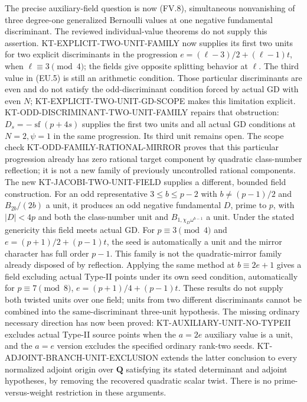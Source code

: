The precise auxiliary-field question is now (FV.8), simultaneous
nonvanishing of three degree-one generalized Bernoulli values
at one negative fundamental discriminant. The reviewed
individual-value theorems do not supply this assertion.
KT-EXPLICIT-TWO-UNIT-FAMILY now supplies its first two
units for two explicit discriminants in the progression
$e=(\ell-3)/2+(\ell-1)t$, when $\ell\equiv3\pmod4$;
the fields give opposite splitting behavior at $\ell$.
The third value in (EU.5) is still an arithmetic condition.
Those particular discriminants are even and do not satisfy
the odd-discriminant condition forced by actual GD with even
$N$; KT-EXPLICIT-TWO-UNIT-GD-SCOPE makes this limitation explicit.
KT-ODD-DISCRIMINANT-TWO-UNIT-FAMILY repairs that obstruction:
$D_s=-\operatorname{sf}(p+4s)$ supplies the first two units
and all actual GD conditions at $N=2,\psi=1$ in the same
progression. Its third unit remains open. The scope check
KT-ODD-FAMILY-RATIONAL-MIRROR proves that this particular
progression already has zero rational target component by
quadratic class-number reflection; it is not a new family of
previously uncontrolled rational components.
The new KT-JACOBI-TWO-UNIT-FIELD supplies a different, bounded
field construction. For an odd representative $3\le b\le p-2$
with $b\ne(p-1)/2$ and $B_{2b}/(2b)$ a unit, it produces
an odd negative fundamental $D$, prime to $p$, with $|D|<4p$
and both the class-number unit and $B_{1,\chi_D\omega^{b-1}}$
a unit. Under the stated genericity this field meets actual GD.
For $p\equiv3\pmod4$ and $e=(p+1)/2+(p-1)t$, the seed
is automatically a unit and the mirror character has full
order $p-1$. This family is not the quadratic-mirror family
already disposed of by reflection. Applying the same method
at $b\equiv2e+1$ gives a field excluding actual Type-II points
under its own seed condition, automatically for
$p\equiv7\pmod8$, $e=(p+1)/4+(p-1)t$.
These results do not supply both twisted units over one field;
units from two different discriminants cannot be combined into
the same-discriminant three-unit hypothesis.
The missing ordinary necessary direction has now been proved:
KT-AUXILIARY-UNIT-NO-TYPEII excludes actual Type-II source points
when the $a=2e$ auxiliary value is a unit, and the $a=e$ version
excludes the specified ordinary rank-two seeds.
KT-ADJOINT-BRANCH-UNIT-EXCLUSION extends the latter conclusion
to every normalized adjoint origin over $\mathbf Q$ satisfying
its stated determinant and adjoint hypotheses, by removing
the recovered quadratic scalar twist. There is no
prime-versus-weight restriction in these arguments.
